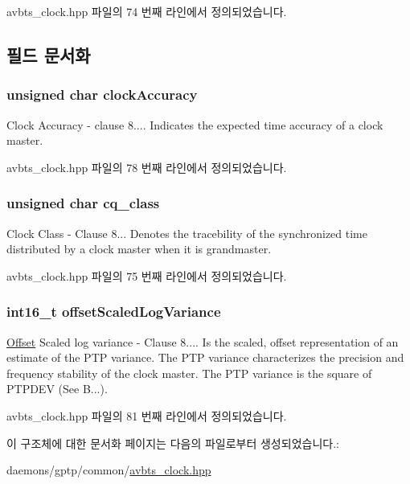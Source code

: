 avbts\+\_\+clock.\+hpp 파일의 74 번째 라인에서 정의되었습니다.



\subsection{필드 문서화}
\subsubsection[{\texorpdfstring{clock\+Accuracy}{clockAccuracy}}]{\setlength{\rightskip}{0pt plus 5cm}unsigned char clock\+Accuracy}\hypertarget{struct_clock_quality_a8d8249dd6640438642472255c8e9aa5d}{}\label{struct_clock_quality_a8d8249dd6640438642472255c8e9aa5d}
Clock Accuracy -\/ clause 8.... Indicates the expected time accuracy of a clock master. 

avbts\+\_\+clock.\+hpp 파일의 78 번째 라인에서 정의되었습니다.

\subsubsection[{\texorpdfstring{cq\+\_\+class}{cq_class}}]{\setlength{\rightskip}{0pt plus 5cm}unsigned char cq\+\_\+class}\hypertarget{struct_clock_quality_a191db8e1a95facda21378069e8c6b504}{}\label{struct_clock_quality_a191db8e1a95facda21378069e8c6b504}
Clock Class -\/ Clause 8... Denotes the tracebility of the synchronized time distributed by a clock master when it is grandmaster. 

avbts\+\_\+clock.\+hpp 파일의 75 번째 라인에서 정의되었습니다.

\subsubsection[{\texorpdfstring{offset\+Scaled\+Log\+Variance}{offsetScaledLogVariance}}]{\setlength{\rightskip}{0pt plus 5cm}int16\+\_\+t offset\+Scaled\+Log\+Variance}\hypertarget{struct_clock_quality_a7106813bdd70baa204ed0c71038fe3a0}{}\label{struct_clock_quality_a7106813bdd70baa204ed0c71038fe3a0}
\hyperlink{class_offset}{Offset} Scaled log variance -\/ Clause 8.... Is the scaled, offset representation of an estimate of the P\+TP variance. The P\+TP variance characterizes the precision and frequency stability of the clock master. The P\+TP variance is the square of P\+T\+P\+D\+EV (See B...). 

avbts\+\_\+clock.\+hpp 파일의 81 번째 라인에서 정의되었습니다.



이 구조체에 대한 문서화 페이지는 다음의 파일로부터 생성되었습니다.\+:\begin{DoxyCompactItemize}
\item 
daemons/gptp/common/\hyperlink{avbts__clock_8hpp}{avbts\+\_\+clock.\+hpp}\end{DoxyCompactItemize}
